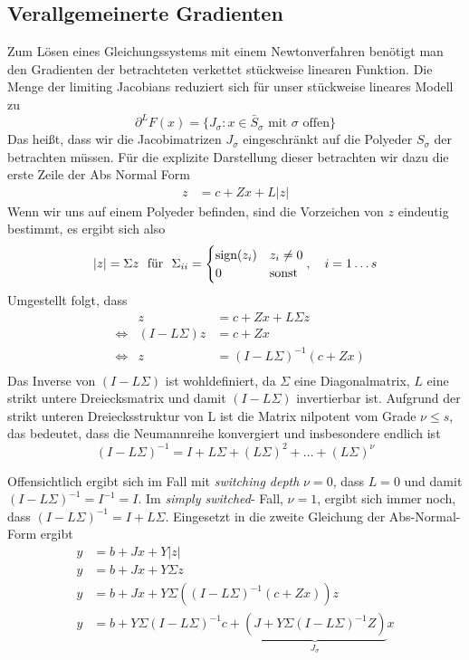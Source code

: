 \subsection{Verallgemeinerte Gradienten}

Zum Lösen eines Gleichungssystems mit einem Newtonverfahren benötigt man den Gradienten der betrachteten verkettet stückweise linearen Funktion. 
Die Menge der limiting Jacobians reduziert sich für unser stückweise lineares Modell zu 
\[
 \partial^L F(x) = \lbrace J_\sigma: x\in \bar S_\sigma \text{ mit }\sigma \text{ offen} \rbrace
\]
Das heißt, dass wir die Jacobimatrizen $J_\sigma$ eingeschränkt auf die Polyeder $S_\sigma$ der betrachten müssen.
Für die explizite Darstellung dieser betrachten wir dazu die erste Zeile der Abs Normal Form
\begin{align*}
	z &= c+ Zx + L|z|
\end{align*}
Wenn wir uns auf einem Polyeder befinden, sind die Vorzeichen von $z$ eindeutig bestimmt, es ergibt sich also  
\begin{align*}
|z| = \Sigma z~ \text{ für }~\Sigma_{ii} =\begin{cases} 
\text{sign}(z_i) & z_i\neq 0\\
0 & \text{sonst}
 \end{cases},\quad i=1\ldots s
\end{align*}
Umgestellt folgt, dass 
\begin{align*}
&&z &= c+ Zx + L\Sigma z\\
&\iff & (I-L\Sigma)z &= c+ Zx \\
&\iff & z &= (I-L\Sigma)^{-1}(c+ Zx)\\
\end{align*}
Das Inverse von $(I-L\Sigma)$ ist wohldefiniert, da $\Sigma$ eine Diagonalmatrix, $L$ eine strikt untere Dreiecksmatrix und damit $(I-L\Sigma)$ invertierbar ist. 
Aufgrund der strikt unteren Dreiecksstruktur von L ist die Matrix nilpotent vom Grade $\nu\leq s$, das bedeutet, dass die Neumannreihe konvergiert und insbesondere endlich ist
\[
(I-L\Sigma)^{-1} = I+L\Sigma + (L\Sigma)^2 + \ldots + (L\Sigma)^{\nu}
\] 

Offensichtlich ergibt sich im Fall mit \textit{switching depth} $\nu = 0$, dass $L=0$ und damit $(I-L\Sigma)^{-1} = I^{-1} = I$. Im \textit{simply switched}- Fall, $\nu=1$, ergibt sich immer noch, dass $(I-L\Sigma)^{-1} =I+L\Sigma$.
Eingesetzt in die zweite Gleichung der Abs-Normal-Form ergibt
\begin{align*}
y &= b+Jx + Y|z|\\
y &= b+Jx + Y\Sigma z\\
y &= b+ Jx + Y\Sigma ((I-L\Sigma)^{-1}(c+ Zx))z\\
y &= b + Y\Sigma(I-L\Sigma)^{-1}c+\underbrace{(J+Y\Sigma(I-L\Sigma)^{-1}Z)}_{J_\sigma}x \\
\end{align*}

